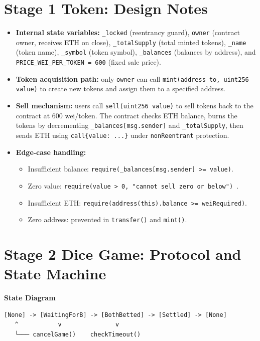 \documentclass[10pt,a4paper]{article}
\begin{document}
\section{Stage 1 Token: Design Notes}
\begin{itemize}
  \item \textbf{Internal state variables:} \texttt{\_locked} (reentrancy guard), \texttt{owner} (contract owner, receives ETH on close), \texttt{\_totalSupply} (total minted tokens), \texttt{\_name} (token name), \texttt{\_symbol} (token symbol), \texttt{\_balances} (balances by address), and \texttt{PRICE\_WEI\_PER\_TOKEN = 600} (fixed sale price).
  \item \textbf{Token acquisition path:} only \texttt{owner} can call \texttt{mint(address to, uint256 value)} to create new tokens and assign them to a specified address.
  \item \textbf{Sell mechanism:} users call \texttt{sell(uint256 value)} to sell tokens back to the contract at 600 wei/token. The contract checks ETH balance, burns the tokens by decrementing \texttt{\_balances[msg.sender]} and \texttt{\_totalSupply}, then sends ETH using \texttt{call\{value: ...\}} under \texttt{nonReentrant} protection.
  \item \textbf{Edge-case handling:}
  \begin{itemize}
    \item Insufficient balance: \texttt{require(\_balances[msg.sender] >= value)}.
    \item Zero value: \texttt{require(value > 0, "cannot sell zero or below") }.
    \item Insufficient ETH: \texttt{require(address(this).balance >= weiRequired)}.
    \item Zero address: prevented in \texttt{transfer()} and \texttt{mint()}.
  \end{itemize}
\end{itemize}

\section{Stage 2 Dice Game: Protocol and State Machine}
\textbf{State Diagram}

\begin{center}
\begin{verbatim}
[None] -> [WaitingForB] -> [BothBetted] -> [Settled] -> [None]
   ^           v               v
   └─── cancelGame()    checkTimeout()
\end{verbatim}
\end{center}
\end{document}
